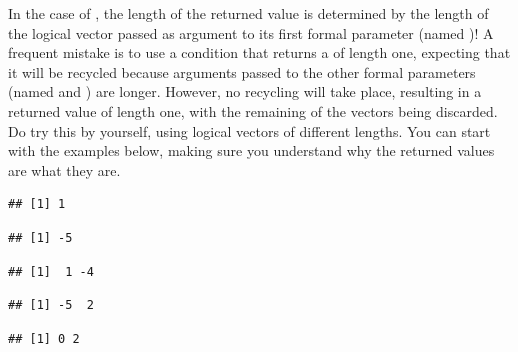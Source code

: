 \documentclass[krantz2]{krantz}\usepackage{knitr}%
\begin{document}
\begin{warningbox}
In the case of , the length of the returned value is determined by the length of the logical vector passed as argument to its first formal parameter (named )! A frequent mistake is to use a condition that returns a  of length one, expecting that it will be recycled because arguments passed to the other formal parameters (named  and ) are longer. However, no recycling will take place, resulting in a returned value of length one, with the remaining of the vectors being discarded. Do try this by yourself, using logical vectors of different lengths. You can start with the examples below, making sure you understand why the returned values are what they are.

\begin{knitrout}\footnotesize
{}\color{fgcolor}\begin{kframe}
\begin{alltt}
\hlstd{(}\hlstd{,} \hlopt{:}\hlstd{,} \hlopt{-}\hlopt{:-}\hlstd{)}
\end{alltt}
\begin{verbatim}
## [1] 1
\end{verbatim}
\begin{alltt}
\hlstd{(}\hlstd{,} \hlopt{:}\hlstd{,} \hlopt{-}\hlopt{:-}\hlstd{)}
\end{alltt}
\begin{verbatim}
## [1] -5
\end{verbatim}
\begin{alltt}
\hlstd{(}\hlstd{(}\hlstd{,} \hlstd{),} \hlopt{:}\hlstd{,} \hlopt{-}\hlopt{:-}\hlstd{)}
\end{alltt}
\begin{verbatim}
## [1]  1 -4
\end{verbatim}
\begin{alltt}
\hlstd{(}\hlstd{(}\hlstd{,} \hlstd{),} \hlopt{:}\hlstd{,} \hlopt{-}\hlopt{:-}\hlstd{)}
\end{alltt}
\begin{verbatim}
## [1] -5  2
\end{verbatim}
\begin{alltt}
\hlstd{(}\hlstd{(}\hlstd{,} \hlstd{),} \hlopt{:}\hlstd{,} \hlstd{)}
\end{alltt}
\begin{verbatim}
## [1] 0 2
\end{verbatim}
\end{kframe}
\end{knitrout}
\end{warningbox}
\end{document}
